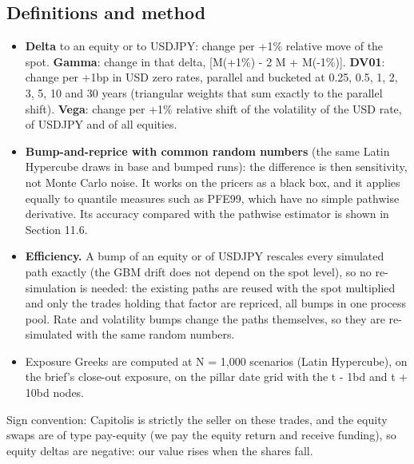 \documentclass[11pt,letterpaper]{article}
\begin{document}
\subsection{Definitions and method}
\begin{itemize}
\item \textbf{Delta} to an equity or to USDJPY: change per +1\% relative move of the spot. \textbf{Gamma}: change in that delta, [M(+1\%) - 2 M + M(-1\%)]. \textbf{DV01}: change per +1bp in USD zero rates, parallel and bucketed at 0.25, 0.5, 1, 2, 3, 5, 10 and 30 years (triangular weights that sum exactly to the parallel shift). \textbf{Vega}: change per +1\% relative shift of the volatility of the USD rate, of USDJPY and of all equities.
\item \textbf{Bump-and-reprice with common random numbers} (the same Latin Hypercube draws in base and bumped runs): the difference is then sensitivity, not Monte Carlo noise. It works on the pricers as a black box, and it applies equally to quantile measures such as PFE99, which have no simple pathwise derivative. Its accuracy compared with the pathwise estimator is shown in Section 11.6.
\item \textbf{Efficiency.} A bump of an equity or of USDJPY rescales every simulated path exactly (the GBM drift does not depend on the spot level), so no re-simulation is needed: the existing paths are reused with the spot multiplied and only the trades holding that factor are repriced, all bumps in one process pool. Rate and volatility bumps change the paths themselves, so they are re-simulated with the same random numbers.
\item Exposure Greeks are computed at N = 1,000 scenarios (Latin Hypercube), on the brief's close-out exposure, on the pillar date grid with the t - 1bd and t + 10bd nodes.
\end{itemize}
Sign convention: Capitolis is strictly the seller on these trades, and the equity swaps are of type pay-equity (we pay the equity return and receive funding), so equity deltas are negative: our value rises when the shares fall.
\end{document}
